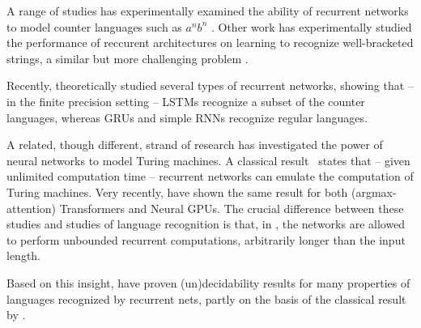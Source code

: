 \documentclass[11pt,a4paper]{article}
\newcounter{theorem}
\begin{document}
A range of studies has experimentally examined the ability of recurrent networks to model counter languages such as $a^nb^n$ \cite{weiss2018practical,suzgun2019evaluating}.
Other work has experimentally studied the performance of reccurent architectures on learning to recognize well-bracketed strings, a similar but more challenging problem \cite{sennhauser2018evaluating,bernardy2018can}.

Recently, \cite{merrill2019sequential} theoretically studied several types of recurrent networks, showing that -- in the finite precision setting -- LSTMs recognize a subset of the counter languages, whereas GRUs and simple RNNs recognize regular languages.


A related, though different, strand of research has investigated the power of neural networks to model Turing machines.
A classical result~\cite{siegelman1991neural} states that -- given unlimited computation time -- recurrent networks can emulate the computation of Turing machines.
Very recently, \cite{perez2019turing} have shown the same result for both (argmax-attention) Transformers and Neural GPUs.
The crucial difference between these studies and studies of language recognition is that, in \cite{siegelman1991neural,perez2019turing}, the networks are allowed to perform unbounded recurrent computations, arbitrarily longer than the input length.

Based on this insight, \cite{chen2017recurrent} have proven (un)decidability results for many properties of languages recognized by recurrent nets, partly on the basis of the classical result by \cite{siegelman1991neural}.




\end{document}
